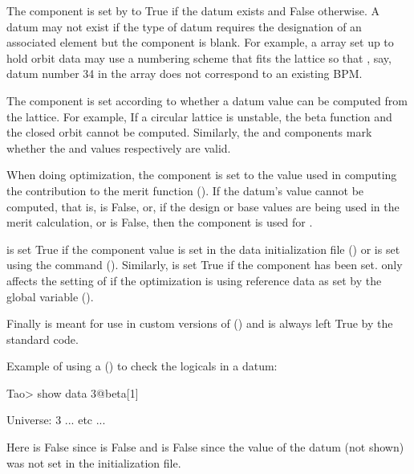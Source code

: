 The  component is set by \tao to True if the datum exists
and False otherwise. A datum may not exist if the type of datum
requires the designation of an associated element but the
 component is blank. For example, a  array
set up to hold orbit data may use a numbering scheme that fits the
lattice so that , say, datum number 34 in the array does not
correspond to an existing BPM.

The  component is set according to whether a datum
value can be computed from the  lattice. For example, If a
circular lattice is unstable, the beta function and the closed orbit
cannot be computed. Similarly, the  and 
components mark whether the  and  values
respectively are valid.

When doing optimization, the  component is set to the
 value used in computing the contribution to the merit
function (). If the datum's value cannot be
computed, that is,  is False, or, if the design or base
values are being used in the merit calculation,  or
 is False, then the  component is used for
.

 is set True if the  component value is set in
the data initialization file () or is set using the
 command (). Similarly,  is set True
if the  component has been set.  only affects the
setting of  if the optimization is using reference data
as set by the global variable  ().

Finally  is meant for use in custom versions of \tao
() and is always left True by the standard \tao code.

Example of using a  () to check the logicals
in a datum:
\begin{example}
  Tao> show data 3@beta[1]

  Universe:   3
      ... etc ...
\end{example}
Here  is False since  is False and
 is False since the  value of the datum (not
shown) was not set in the \tao initialization file.

